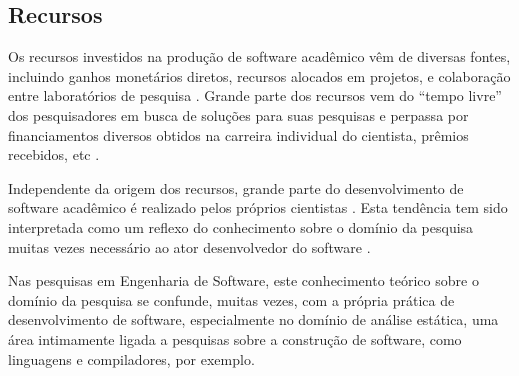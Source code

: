 


\subsection{Recursos}

Os recursos investidos na produção de software acadêmico vêm de diversas
fontes, incluindo ganhos monetários diretos, recursos alocados em projetos, e
colaboração entre laboratórios de pesquisa \cite{howison2015understanding}.
Grande parte dos recursos vem do ``tempo livre'' dos pesquisadores em busca de
soluções para suas pesquisas e perpassa por financiamentos diversos obtidos na
carreira individual do cientista, prêmios recebidos, etc
\cite{howison2015understanding}.

Independente da origem dos recursos, grande parte do desenvolvimento de
software acadêmico é realizado pelos próprios cientistas \cite{hettrick2014uk,
momcheva2015software}.
Esta tendência tem sido interpretada como um reflexo do conhecimento sobre o
domínio da pesquisa muitas vezes necessário ao ator desenvolvedor do software
\cite{segal2008developing}.

Nas pesquisas em Engenharia de Software, este conhecimento teórico sobre o
domínio da pesquisa se confunde, muitas vezes, com a própria prática de
desenvolvimento de software, especialmente no domínio de análise estática, uma
área intimamente ligada a pesquisas sobre a construção de software,
como linguagens e compiladores, por exemplo.

